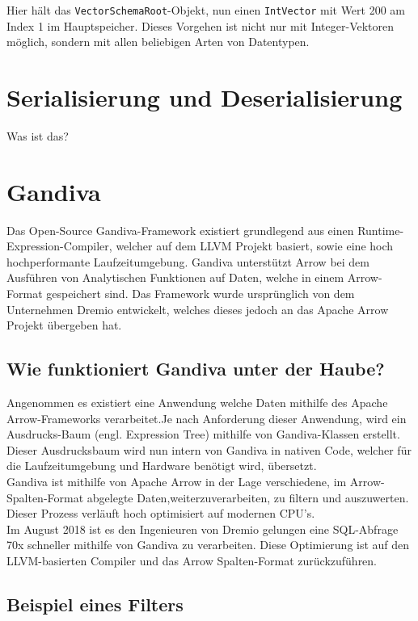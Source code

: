Hier hält das \texttt{VectorSchemaRoot}-Objekt, nun einen \texttt{IntVector} mit Wert 200 am Index 1 im Hauptspeicher.
Dieses Vorgehen ist nicht nur mit Integer-Vektoren möglich, sondern mit allen beliebigen Arten von Datentypen.


\section{Serialisierung und Deserialisierung}

Was ist das?

\section{Gandiva}
Das Open-Source Gandiva-Framework existiert grundlegend aus  einen Runtime-Expression-Compiler, welcher auf dem LLVM Projekt basiert, sowie eine hoch hochperformante Laufzeitumgebung.
Gandiva unterstützt Arrow bei dem Ausführen von Analytischen Funktionen auf Daten, welche in einem Arrow-Format gespeichert sind. 
Das Framework wurde ursprünglich von dem Unternehmen Dremio entwickelt, welches dieses jedoch an das Apache Arrow Projekt übergeben hat.\cite{Apache:Gandiva}

\subsection{Wie funktioniert Gandiva unter der Haube?}
Angenommen es existiert eine Anwendung welche Daten mithilfe des  Apache Arrow-Frameworks verarbeitet.Je nach Anforderung dieser Anwendung, wird ein Ausdrucks-Baum (engl. Expression Tree) mithilfe von Gandiva-Klassen erstellt. Dieser Ausdrucksbaum wird nun intern von Gandiva in nativen Code, welcher für die Laufzeitumgebung und Hardware benötigt wird, übersetzt. \\
Gandiva ist mithilfe von Apache Arrow in der Lage verschiedene, im Arrow-Spalten-Format abgelegte Daten,weiterzuverarbeiten, zu filtern und auszuwerten.
Dieser Prozess verläuft hoch optimisiert auf modernen CPU's.\cite{Apache:Gandiva} \\
Im August 2018 ist es den Ingenieuren von Dremio gelungen eine SQL-Abfrage 70x schneller mithilfe von Gandiva zu verarbeiten. Diese Optimierung ist auf den LLVM-basierten Compiler und das Arrow Spalten-Format zurückzuführen.\cite{Apache:Gandiva:Performance}

\newpage

\subsection{Beispiel eines Filters}
\label{Beispiel eines Filters}

